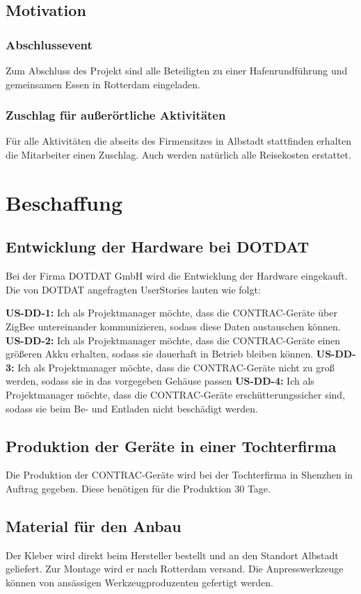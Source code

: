 \subsection{Motivation} %
\subsubsection{Abschlussevent} Zum Abschluss des Projekt sind alle Beteiligten zu einer Hafenrundführung und gemeinsamen Essen in Rotterdam eingeladen.
\subsubsection{Zuschlag für außerörtliche Aktivitäten} Für alle Aktivitäten die abseits des Firmensitzes in Albstadt stattfinden erhalten die Mitarbeiter einen Zuschlag. Auch werden natürlich alle Reisekosten erstattet.

\section{Beschaffung} %
\subsection{Entwicklung der Hardware bei DOTDAT}
Bei der Firma DOTDAT GmbH wird die Entwicklung der Hardware eingekauft. Die von DOTDAT angefragten UserStories lauten wie folgt:

\textbf{US-DD-1:} Ich als Projektmanager möchte, dass die CONTRAC-Geräte über ZigBee untereinander kommunizieren, sodass diese Daten austauschen können.
\textbf{US-DD-2:} Ich als Projektmanager möchte, dass die CONTRAC-Geräte einen größeren Akku erhalten, sodass sie dauerhaft in Betrieb bleiben können.
\textbf{US-DD-3:} Ich als Projektmanager möchte, dass die CONTRAC-Geräte nicht zu groß werden, sodass sie in das vorgegeben Gehäuse passen
\textbf{US-DD-4:} Ich als Projektmanager möchte, dass die CONTRAC-Geräte erschütterungssicher sind, sodass sie beim Be- und Entladen nicht beschädigt werden.

\subsection{Produktion der Geräte in einer Tochterfirma}
Die Produktion der CONTRAC-Geräte wird bei der Tochterfirma in Shenzhen in Auftrag gegeben. Diese benötigen für die Produktion 30 Tage.

\subsection{Material für den Anbau}
Der Kleber wird direkt beim Hersteller bestellt und an den Standort Albstadt geliefert. Zur Montage wird er nach Rotterdam versand. Die Anpresswerkzeuge können von ansässigen Werkzeugproduzenten gefertigt werden.

